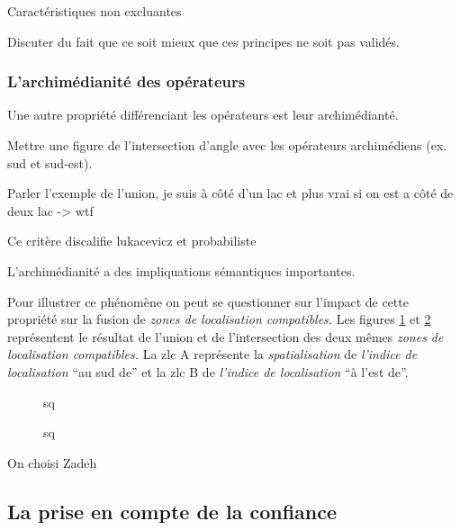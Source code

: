 Caractéristiques non excluantes

Discuter du fait que ce soit mieux que ces principes ne soit pas
validés.

\subsubsection{L'archimédianité des opérateurs}

Une autre propriété différenciant les opérateurs est leur
archimédianté.

Mettre une figure de l'intersection d'angle avec les opérateurs
archimédiens (ex. sud et sud-est).

Parler l'exemple de l'union, je suis à côté d'un lac et plus vrai si
on est a côté de deux lac -> wtf

Ce critère discalifie lukacevicz et probabiliste

L'archimédianité a des impliquations sémantiques importantes.

Pour illustrer ce phénomène on peut se questionner sur l'impact de
cette propriété sur la fusion de \emph{zones de localisation
  compatibles.}  Les figures \ref{fig:comparaison_operateurs_union} et
\ref{fig:comparaison_operateurs_intersection} représentent le résultat
de l'union et de l'intersection des deux mêmes \emph{zones de
  localisation compatibles.} La \ac{zlc}
\textcolor{RdBu-9-1}{\textsf{A}} représente la \emph{spatialisation}
de \emph{l'indice de localisation} \enquote{au sud de} et la \ac{zlc}
\textcolor{RdBu-9-9}{\textsf{B}} de \emph{l'indice de localisation}
\enquote{à l'est de}.

\begin{figure}
  \centering
  
  \caption{sq}
  \label{fig:comparaison_operateurs_union}
\end{figure}

\begin{figure}
  \centering
  
  \caption{sq}
  \label{fig:comparaison_operateurs_intersection}
\end{figure}



On choisi Zadeh

\subsection{La prise en compte de la confiance}

